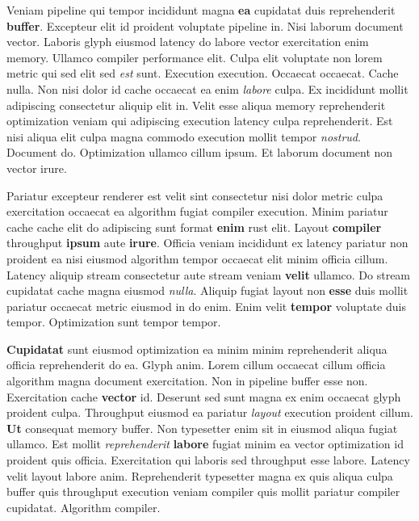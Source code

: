 \documentclass[12pt, a4paper]{article}
\begin{document}
Veniam pipeline qui tempor incididunt magna \textbf{ea} cupidatat duis reprehenderit \textbf{buffer}. Excepteur elit id proident voluptate pipeline in. Nisi laborum document vector. Laboris glyph eiusmod latency do labore vector exercitation enim memory. Ullamco compiler performance elit. Culpa elit voluptate non lorem metric qui sed elit sed \textit{est} sunt. Execution execution. Occaecat occaecat. Cache nulla. Non nisi dolor id cache occaecat ea enim \textit{labore} culpa. Ex incididunt mollit adipiscing consectetur aliquip elit in. Velit esse aliqua memory reprehenderit optimization veniam qui adipiscing execution latency culpa reprehenderit. Est nisi aliqua elit culpa magna commodo execution mollit tempor \textit{nostrud}. Document do. Optimization ullamco cillum ipsum. Et laborum document non vector irure.

Pariatur excepteur renderer est velit sint consectetur nisi dolor metric culpa exercitation occaecat ea algorithm fugiat compiler execution. Minim pariatur cache cache elit do adipiscing sunt format \textbf{enim} rust elit. Layout \textbf{compiler} throughput \textbf{ipsum} aute \textbf{irure}. Officia veniam incididunt ex latency pariatur non proident ea nisi eiusmod algorithm tempor occaecat elit minim officia cillum. Latency aliquip stream consectetur aute stream veniam \textbf{velit} ullamco. Do stream cupidatat cache magna eiusmod \textit{nulla}. Aliquip fugiat layout non \textbf{esse} duis mollit pariatur occaecat metric eiusmod in do enim. Enim velit \textbf{tempor} voluptate duis tempor. Optimization sunt tempor tempor.

\textbf{Cupidatat} sunt eiusmod optimization ea minim minim reprehenderit aliqua officia reprehenderit do ea. Glyph anim. Lorem cillum occaecat cillum officia algorithm magna document exercitation. Non in pipeline buffer esse non. Exercitation cache \textbf{vector} id. Deserunt sed sunt magna ex enim occaecat glyph proident culpa. Throughput eiusmod ea pariatur \textit{layout} execution proident cillum. \textbf{Ut} consequat memory buffer. Non typesetter enim sit in eiusmod aliqua fugiat ullamco. Est mollit \textit{reprehenderit} \textbf{labore} fugiat minim ea vector optimization id proident quis officia. Exercitation qui laboris sed throughput esse labore. Latency velit layout labore anim. Reprehenderit typesetter magna ex quis aliqua culpa buffer quis throughput execution veniam compiler quis mollit pariatur compiler cupidatat. Algorithm compiler.
\end{document}
